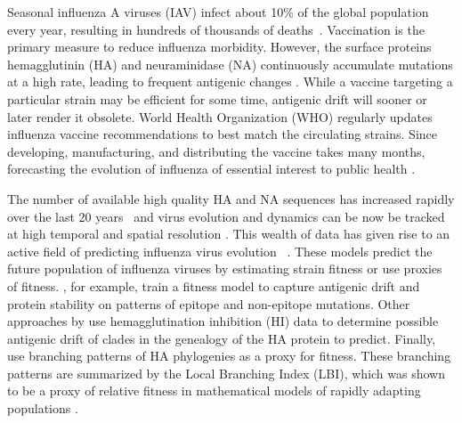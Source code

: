 \documentclass[reprint,amsmath,amssymb,superscriptaddress,showpacs,pre]{revtex4-1}
\begin{document}
	Seasonal influenza A viruses (IAV) infect about 10\% of the global population every year, resulting in hundreds of thousands of deaths~\cite{WHOfactsheet,petrova_evolution_2017}. Vaccination is the primary measure to reduce influenza morbidity.
	However, the surface proteins hemagglutinin (HA) and neuraminidase (NA) continuously accumulate mutations at a high rate, leading to frequent antigenic changes \cite{petrova_evolution_2017, Shih6283, bhatt_genomic_2011, Koel976}. 
	While a vaccine targeting a particular strain may be efficient for some time, antigenic drift will sooner or later render it obsolete.
	World Health Organization (WHO) regularly updates influenza vaccine recommendations to best match the circulating strains. 
	Since developing, manufacturing, and distributing the vaccine takes many months, forecasting the evolution of influenza of essential interest to public health \citep{morris2018predictive,klingen_silico_2018}.
	
	The number of available high quality HA and NA sequences has increased rapidly over the last 20 years~\cite{bogner2006global, shu2017gisaid} and virus evolution and dynamics can be now be tracked at high temporal and spatial resolution \cite{rambaut_genomic_2008}.
	This wealth of data has given rise to an active field of predicting influenza virus evolution ~\cite{morris2018predictive,klingen_silico_2018}. 
	These models predict the future population of influenza viruses by estimating strain fitness or use proxies of fitness.
	\citet{luksza_predictive_2014}, for example, train a fitness model to capture antigenic drift and protein stability on patterns of epitope and non-epitope mutations. 
	Other approaches by \citet{Steinbrueck12123, neher_prediction_2016} use  hemagglutination inhibition (HI) data to determine possible antigenic drift of clades in the genealogy of the HA protein to predict. 
	Finally, \citet{neher_predicting_2014} use branching patterns of HA phylogenies as a proxy for fitness. 
	These branching patterns are summarized by the Local Branching Index (LBI), which was shown to be a proxy of relative fitness in mathematical models of rapidly adapting populations \citep{neher_predicting_2014}.
	
\end{document}
